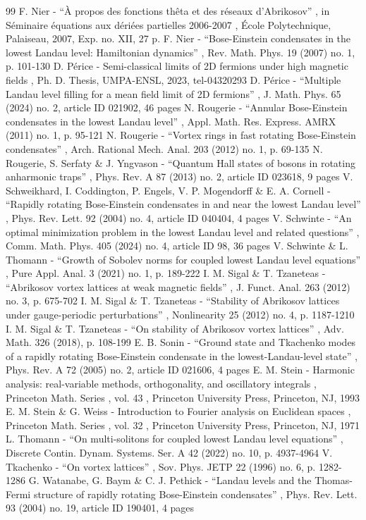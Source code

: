 \documentclass[10pt]{amsart}
\theoremstyle{definition}
\begin{document}
\begin{thebibliography}{99}
 F. Nier - “À propos des fonctions thêta et des réseaux d’Abrikosov” , in Séminaire équations aux dériées partielles 2006-2007 , École Polytechnique, Palaiseau, 2007, Exp. no. XII, 27 p.
 F. Nier - “Bose-Einstein condensates in the lowest Landau level: Hamiltonian dynamics” , Rev. Math. Phys. 19 (2007) no. 1, p. 101-130
 D. Périce - Semi-classical limits of 2D fermions under high magnetic fields , Ph. D. Thesis, UMPA-ENSL, 2023, tel-04320293
 D. Périce - “Multiple Landau level filling for a mean field limit of 2D fermions” , J. Math. Phys. 65 (2024) no. 2, article ID 021902, 46 pages
 N. Rougerie - “Annular Bose-Einstein condensates in the lowest Landau level” , Appl. Math. Res. Express. AMRX (2011) no. 1, p. 95-121
 N. Rougerie - “Vortex rings in fast rotating Bose-Einstein condensates” , Arch. Rational Mech. Anal. 203 (2012) no. 1, p. 69-135
 N. Rougerie, S. Serfaty \& J. Yngvason - “Quantum Hall states of bosons in rotating anharmonic traps” , Phys. Rev. A 87 (2013) no. 2, article ID 023618, 9 pages
 V. Schweikhard, I. Coddington, P. Engels, V. P. Mogendorff \& E. A. Cornell - “Rapidly rotating Bose-Einstein condensates in and near the lowest Landau level” , Phys. Rev. Lett. 92 (2004) no. 4, article ID 040404, 4 pages
 V. Schwinte - “An optimal minimization problem in the lowest Landau level and related questions” , Comm. Math. Phys. 405 (2024) no. 4, article ID 98, 36 pages
 V. Schwinte \& L. Thomann - “Growth of Sobolev norms for coupled lowest Landau level equations” , Pure Appl. Anal. 3 (2021) no. 1, p. 189-222
 I. M. Sigal \& T. Tzaneteas - “Abrikosov vortex lattices at weak magnetic fields” , J. Funct. Anal. 263 (2012) no. 3, p. 675-702
 I. M. Sigal \& T. Tzaneteas - “Stability of Abrikosov lattices under gauge-periodic perturbations” , Nonlinearity 25 (2012) no. 4, p. 1187-1210
 I. M. Sigal \& T. Tzaneteas - “On stability of Abrikosov vortex lattices” , Adv. Math. 326 (2018), p. 108-199
 E. B. Sonin - “Ground state and Tkachenko modes of a rapidly rotating Bose-Einstein condensate in the lowest-Landau-level state” , Phys. Rev. A 72 (2005) no. 2, article ID 021606, 4 pages
 E. M. Stein - Harmonic analysis: real-variable methods, orthogonality, and oscillatory integrals , Princeton Math. Series , vol. 43 , Princeton University Press, Princeton, NJ, 1993
 E. M. Stein \& G. Weiss - Introduction to Fourier analysis on Euclidean spaces , Princeton Math. Series , vol. 32 , Princeton University Press, Princeton, NJ, 1971
 L. Thomann - “On multi-solitons for coupled lowest Landau level equations” , Discrete Contin. Dynam. Systems. Ser. A 42 (2022) no. 10, p. 4937-4964
 V. Tkachenko - “On vortex lattices” , Sov. Phys. JETP 22 (1996) no. 6, p. 1282-1286
 G. Watanabe, G. Baym \& C. J. Pethick - “Landau levels and the Thomas-Fermi structure of rapidly rotating Bose-Einstein condensates” , Phys. Rev. Lett. 93 (2004) no. 19, article ID 190401, 4 pages
\end{thebibliography}
\end{document}
